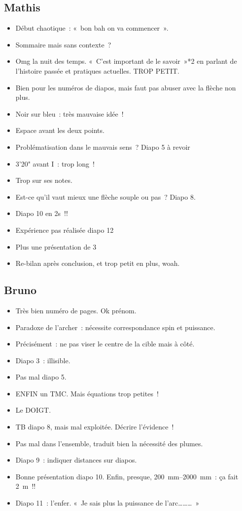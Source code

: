 \documentclass[a4paper, 11pt, final, garamond]{book}
\begin{document}
\subsection{Mathis}
\begin{itemize}
  \item Début chaotique~: «~bon bah on va commencer~».
  \item Sommaire mais sans contexte~?
  \item Omg la nuit des temps. «~C'est important de le savoir~»*2 en parlant de
    l'histoire passée et pratiques actuelles.
    TROP PETIT.
  \item Bien pour les numéros de diapos, mais faut pas abuser avec la flèche non
    plus.
  \item Noir sur bleu~: très mauvaise idée~!
  \item Espace avant les deux points.
  \item Problématisation dans le mauvais sens~? Diapo 5 à revoir
  \item 3'20" avant I~: trop long~!
  \item Trop sur ses notes.
  \item Est-ce qu'il vaut mieux une flèche souple ou pas~? Diapo 8.
  \item Diapo 10 en 2s~!!
  \item Expérience pas réalisée diapo 12
  \item Plus une présentation de 3\ieme
  \item Re-bilan après conclusion, et trop petit en plus, woah.
\end{itemize}

\subsection{Bruno}
\begin{itemize}
  \item Très bien numéro de pages. Ok prénom.
  \item Paradoxe de l'archer~: nécessite correspondance spin et puissance.
  \item Précisément~: ne pas viser le centre de la cible mais à côté.
  \item Diapo 3~: illisible.
  \item Pas mal diapo 5.
  \item ENFIN un TMC. Mais équations trop petites~!
  \item Le DOIGT.
  \item TB diapo 8, mais mal exploitée. Décrire l'évidence~!
  \item Pas mal dans l'ensemble, traduit bien la nécessité des plumes.
  \item Diapo 9~: indiquer distances sur diapos.
  \item Bonne présentation diapo 10. Enfin, presque, \SIrange{200}{2000}{mm}~:
    ça fait \SI{2}{m}~!!
  \item Diapo 11~: l'enfer. «~Je sais plus la puissance de l'arc………~»
\end{itemize}
\end{document}
